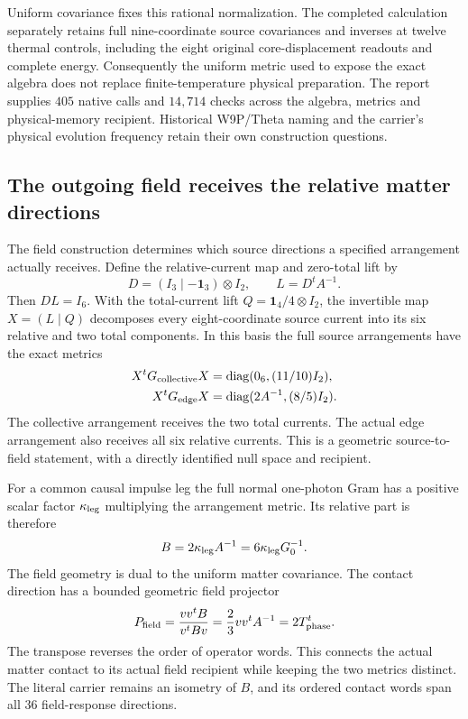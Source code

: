 Uniform covariance fixes this rational normalization. The completed calculation separately retains full nine-coordinate source covariances and inverses at twelve thermal controls, including the eight original core-displacement readouts and complete energy. Consequently the uniform metric used to expose the exact algebra does not replace finite-temperature physical preparation. The report supplies $405$ native calls and $14{,}714$ checks across the algebra, metrics and physical-memory recipient. Historical W9P/Theta naming and the carrier's physical evolution frequency retain their own construction questions.

\subsection{The outgoing field receives the relative matter directions}

The field construction determines which source directions a specified arrangement actually receives. Define the relative-current map and zero-total lift by
\begin{equation}
 D=(I_3\mid-\mathbf1_3)\otimes I_2,\qquad
 L=D^tA^{-1}.
\end{equation}
Then $DL=I_6$. With the total-current lift $Q=\mathbf1_4/4\otimes I_2$, the invertible map $X=(L\mid Q)$ decomposes every eight-coordinate source current into its six relative and two total components. In this basis the full source arrangements have the exact metrics
\begin{align}
 X^tG_{\rm collective}X&=\operatorname{diag}(0_6,(11/10)I_2),\\
 X^tG_{\rm edge}X&=\operatorname{diag}(2A^{-1},(8/5)I_2).
\end{align}
The collective arrangement receives the two total currents. The actual edge arrangement also receives all six relative currents. This is a geometric source-to-field statement, with a directly identified null space and recipient.

For a common causal impulse leg the full normal one-photon Gram has a positive scalar factor $\kappa_{\rm leg}$ multiplying the arrangement metric. Its relative part is therefore
\begin{equation}
 B=2\kappa_{\rm leg}A^{-1}
   =6\kappa_{\rm leg}G_0^{-1}.
\end{equation}
The field geometry is dual to the uniform matter covariance. The contact direction has a bounded geometric field projector
\begin{equation}
 P_{\rm field}=\frac{vv^tB}{v^tBv}
              =\frac23vv^tA^{-1}
              =2T_{\rm phase}^t.
\end{equation}
The transpose reverses the order of operator words. This connects the actual matter contact to its actual field recipient while keeping the two metrics distinct. The literal carrier remains an isometry of $B$, and its ordered contact words span all $36$ field-response directions.

